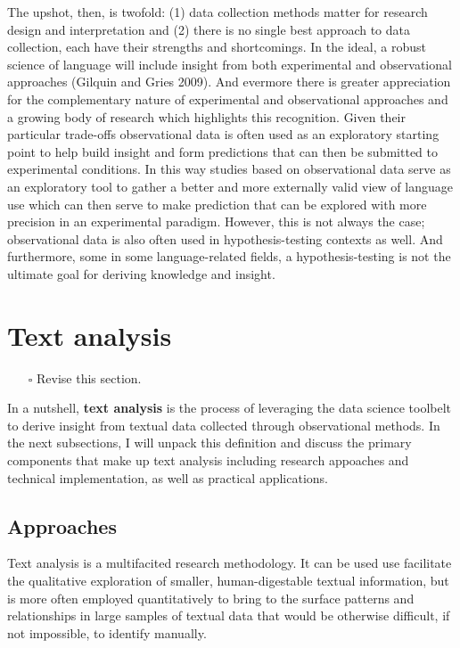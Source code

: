 \documentclass[
  letterpaper,
]{latex/krantz}
\providecommand{\tightlist}{%
  \setlength{\itemsep}{0pt}\setlength{\parskip}{0pt}}\usepackage{longtable,booktabs,array}
\begin{document}
The upshot, then, is twofold: (1) data collection methods matter for
research design and interpretation and (2) there is no single best
approach to data collection, each have their strengths and shortcomings.
In the ideal, a robust science of language will include insight from
both experimental and observational approaches (Gilquin and Gries 2009).
And evermore there is greater appreciation for the complementary nature
of experimental and observational approaches and a growing body of
research which highlights this recognition. Given their particular
trade-offs observational data is often used as an exploratory starting
point to help build insight and form predictions that can then be
submitted to experimental conditions. In this way studies based on
observational data serve as an exploratory tool to gather a better and
more externally valid view of language use which can then serve to make
prediction that can be explored with more precision in an experimental
paradigm. However, this is not always the case; observational data is
also often used in hypothesis-testing contexts as well. And furthermore,
some in some language-related fields, a hypothesis-testing is not the
ultimate goal for deriving knowledge and insight.

\hypertarget{text-analysis}{%
\section{Text analysis}\label{text-analysis}}

\begin{itemize}
\tightlist
\item[$\square$]
  Revise this section.
\end{itemize}

In a nutshell, \textbf{text analysis} is the
process of leveraging the data science toolbelt to derive insight from
textual data collected through observational methods. In the next
subsections, I will unpack this definition and discuss the primary
components that make up text analysis including research appoaches and
technical implementation, as well as practical applications.

\hypertarget{approaches}{%
\subsection{Approaches}\label{approaches}}

Text analysis is a multifacited research methodology. It can be used use
facilitate the qualitative exploration of smaller, human-digestable
textual information, but is more often employed quantitatively to bring
to the surface patterns and relationships in large samples of textual
data that would be otherwise difficult, if not impossible, to identify
manually.
\end{document}
